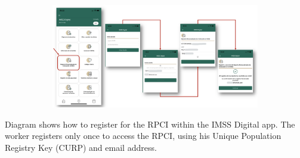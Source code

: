 \begin{figure}[H]
    \caption{Registering for the RPCI}
    \label{rpci_register}
    \begin{center}
    
    \begin{subfigure}{0.9\textwidth}
    \includegraphics[width=\textwidth]{04_Figures/rpci_app/rpci_register.png}
    \end{subfigure}

    \end{center}
\end{figure}
\scriptsize{
\noindent Diagram shows how to register for the RPCI within the IMSS Digital app. The worker registers only once to access the RPCI, using his Unique Population Registry Key (CURP) and email address.
}

\clearpage

